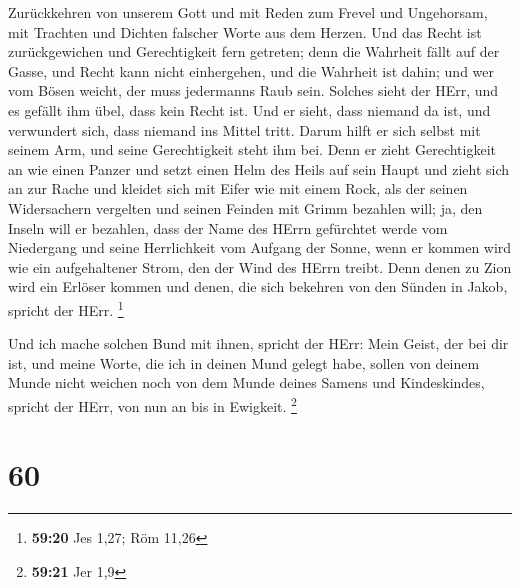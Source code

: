 Zurückkehren von unserem Gott und mit Reden zum Frevel und Ungehorsam,
mit Trachten und Dichten falscher Worte aus dem Herzen. 
Und das Recht ist zurückgewichen und Gerechtigkeit fern getreten; denn
die Wahrheit fällt auf der Gasse, und Recht kann nicht einhergehen,
 und die Wahrheit ist dahin; und wer vom Bösen weicht, der
muss jedermanns Raub sein. Solches sieht der HErr, und es gefällt ihm
übel, dass kein Recht ist.  Und er sieht, dass niemand da
ist, und verwundert sich, dass niemand ins Mittel tritt. Darum hilft er
sich selbst mit seinem Arm, und seine Gerechtigkeit steht ihm bei.
 Denn er zieht Gerechtigkeit an wie einen Panzer und setzt
einen Helm des Heils auf sein Haupt und zieht sich an zur Rache und
kleidet sich mit Eifer wie mit einem Rock,  als der seinen
Widersachern vergelten und seinen Feinden mit Grimm bezahlen will; ja,
den Inseln will er bezahlen,  dass der Name des HErrn
gefürchtet werde vom Niedergang und seine Herrlichkeit vom Aufgang der
Sonne, wenn er kommen wird wie ein aufgehaltener Strom, den der Wind des
HErrn treibt.  Denn denen zu Zion wird ein Erlöser kommen
und denen, die sich bekehren von den Sünden in Jakob, spricht der HErr.
\footnote{\textbf{59:20} Jes 1,27; Röm 11,26}

 Und ich mache solchen Bund mit ihnen, spricht der HErr:
Mein Geist, der bei dir ist, und meine Worte, die ich in deinen Mund
gelegt habe, sollen von deinem Munde nicht weichen noch von dem Munde
deines Samens und Kindeskindes, spricht der HErr, von nun an bis in
Ewigkeit. \footnote{\textbf{59:21} Jer 1,9}

\hypertarget{section-23}{%
\section{60}\label{section-23}}

